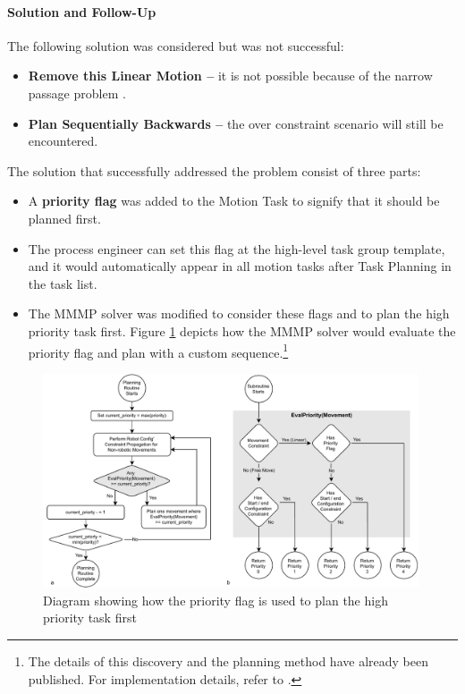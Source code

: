 \paragraph{Solution and Follow-Up}

The following solution was considered but was not successful:

\begin{itemize}
	\item \textbf{Remove this Linear Motion --} it is not possible because of the narrow passage problem . 
	\item \textbf{Plan Sequentially Backwards --} the over constraint scenario will still be encountered.

\end{itemize}

The solution that successfully addressed the problem consist of three parts:
\begin{itemize}
	\item A \textbf{priority flag }was added to the Motion Task to signify that it should be planned first. 

	\item The process engineer can set this flag at the high-level task group template, and it would automatically appear in all motion tasks after Task Planning in the task list.

	\item The MMMP solver was modified to consider these flags and to plan the high priority task first. Figure \ref{fig:priority-flag} depicts how the MMMP solver would evaluate the priority flag and plan with a custom sequence.\footnote{The details of this discovery and the planning method have already been published. For implementation details, refer to \parencite{huangNewAnalogProtocol2021}.}

\end{itemize}

\begin{figure}[!h]
    \centering
    \includegraphics[width=0.99\textwidth]{images/6a/image47.pdf}
    \caption{Diagram showing how the priority flag is used to plan the high priority task first}
    \label{fig:priority-flag}
\end{figure}

